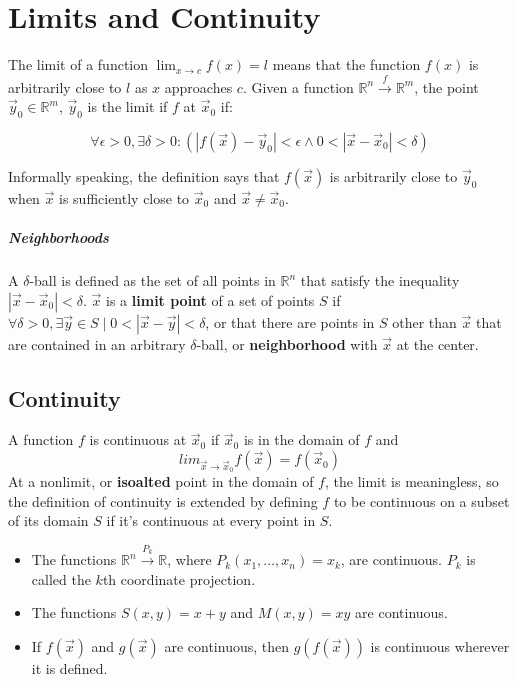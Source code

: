 \documentclass[11pt]{article}
\begin{document}
\section{Limits and Continuity}
	The limit of a function $\lim_{x\rightarrow c} f(x) = l$ means that the function $f(x)$ is arbitrarily close to $l$ as $x$ approaches $c$. Given a function $\mathbb{R}^n \xrightarrow{f} \mathbb{R}^m$, the point $\vec{y}_0 \in \mathbb{R}^m$, $\vec{y}_0$ is the limit if $f$ at $\vec{x}_0$ if:
	
	\[\forall \epsilon > 0, \exists \delta > 0: (|f(\vec{x}) - \vec{y}_0 | < \epsilon \wedge 0 < |\vec{x} - \vec{x}_0| < \delta)\]
	
	Informally speaking, the definition says that $f(\vec{x})$ is arbitrarily close to $\vec{y}_0$ when $\vec{x}$ is sufficiently close to $\vec{x}_0$ and $\vec{x}\neq \vec{x}_0$.
	
	\subparagraph{Neighborhoods} A $\delta$-ball is defined as the set of all points in $\mathbb{R}^n$ that satisfy the inequality $|\vec{x}-\vec{x}_0| < \delta$. $\vec{x}$ is a \textbf{limit point} of a set of points $S$ if $\forall \delta > 0, \exists \vec{y} \in S \mid 0 < |\vec{x} - \vec{y}| < \delta$, or that there are points in $S$ other than $\vec{x}$ that are contained in an arbitrary $\delta$-ball, or \textbf{neighborhood} with $\vec{x}$ at the center.
	
	\subsection{Continuity}
		A function $f$ is continuous at $\vec{x}_0$ if $\vec{x}_0$ is in the domain of $f$ and \[lim_{\vec{x} \rightarrow \vec{x}_0} f(\vec{x}) = f(\vec{x}_0)\]
		At a nonlimit, or \textbf{isoalted} point in the domain of $f$, the limit is meaningless, so the definition of continuity is extended by defining $f$ to be continuous on a subset of its domain $S$ if it's continuous at every point in $S$.
		\begin{itemize}
			\item The functions $\mathbb{R}^n \xrightarrow{P_k} \mathbb{R}$, where $P_k (x_1,\ldots , x_n) = x_k$, are continuous. $P_k$ is called the $k$th coordinate projection.
			\item The functions $S(x, y) = x + y$ and $M(x, y) = xy$ are continuous.
			\item If $f(\vec{x})$ and $g(\vec{x})$ are continuous, then $g(f(\vec{x}))$ is continuous wherever it is defined.
		\end{itemize}
		
\end{document}

